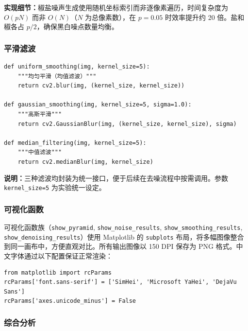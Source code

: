 \documentclass[12pt,a4paper]{ctexart}
\begin{document}
\textbf{实现细节：}椒盐噪声生成使用随机坐标索引而非逐像素遍历，时间复杂度为 $O(pN)$ 而非 $O(N)$（$N$ 为总像素数），在 $p=0.05$ 时效率提升约 20 倍。盐和椒各占 $p/2$，确保黑白噪点数量均衡。

\subsubsection*{平滑滤波}

\begin{lstlisting}[caption={三种滤波函数}, label=lst:filters]
def uniform_smoothing(img, kernel_size=5):
    """均匀平滑（均值滤波）"""
    return cv2.blur(img, (kernel_size, kernel_size))

def gaussian_smoothing(img, kernel_size=5, sigma=1.0):
    """高斯平滑"""
    return cv2.GaussianBlur(img, (kernel_size, kernel_size), sigma)

def median_filtering(img, kernel_size=5):
    """中值滤波"""
    return cv2.medianBlur(img, kernel_size)
\end{lstlisting}

\textbf{说明：}三种滤波均封装为统一接口，便于后续在去噪流程中按需调用。参数 \texttt{kernel\_size=5} 为实验统一设定。

\subsubsection*{可视化函数}

可视化函数族（\texttt{show\_pyramid}, \texttt{show\_noise\_results}, \texttt{show\_smoothing\_results}, \texttt{show\_denoising\_results}）使用 Matplotlib 的 \texttt{subplots} 布局，将多幅图像整合到同一画布中，方便直观对比。所有输出图像以 150 DPI 保存为 PNG 格式。中文字体通过以下配置保证正常渲染：

\begin{lstlisting}[caption={中文字体配置}]
from matplotlib import rcParams
rcParams['font.sans-serif'] = ['SimHei', 'Microsoft YaHei', 'DejaVu Sans']
rcParams['axes.unicode_minus'] = False
\end{lstlisting}

\subsubsection*{综合分析}
\end{document}
